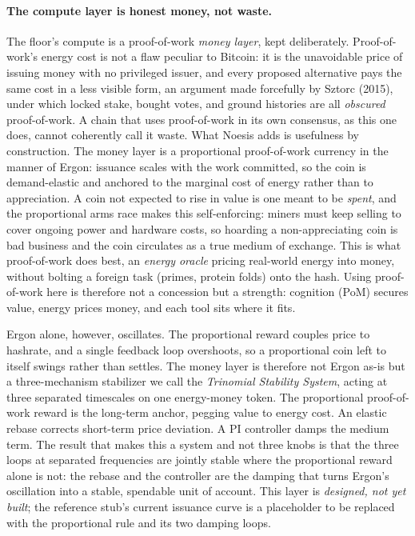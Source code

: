 \documentclass[10pt]{article}
\begin{document}
\paragraph{The compute layer is honest money, not waste.} The floor's compute is a proof-of-work
\emph{money layer}, kept deliberately. Proof-of-work's energy cost is not a flaw peculiar to Bitcoin: it
is the unavoidable price of issuing money with no privileged issuer, and every proposed alternative pays
the same cost in a less visible form, an argument made forcefully by Sztorc (2015), under which locked
stake, bought votes, and ground histories are all \emph{obscured} proof-of-work. A chain that uses
proof-of-work in its own consensus, as this one does, cannot coherently call it waste. What Noesis adds
is usefulness by construction. The money layer is a proportional proof-of-work currency in the manner of
Ergon: issuance scales with the work committed, so the coin is demand-elastic and anchored to the
marginal cost of energy rather than to appreciation. A coin not expected to rise in value is one meant to
be \emph{spent}, and the proportional arms race makes this self-enforcing: miners must keep selling to
cover ongoing power and hardware costs, so hoarding a non-appreciating coin is bad business and the coin
circulates as a true medium of exchange. This is what proof-of-work does best, an \emph{energy oracle}
pricing real-world energy into money, without bolting a foreign task (primes, protein folds) onto the
hash. Using proof-of-work here is therefore not a concession but a strength: cognition (PoM) secures
value, energy prices money, and each tool sits where it fits.

Ergon alone, however, oscillates. The proportional reward couples price to hashrate, and a single
feedback loop overshoots, so a proportional coin left to itself swings rather than settles. The money
layer is therefore not Ergon as-is but a three-mechanism stabilizer we call the \emph{Trinomial
Stability System}, acting at three separated timescales on one energy-money token. The proportional proof-of-work
reward is the long-term anchor, pegging value to energy cost. An elastic rebase corrects short-term
price deviation. A PI controller damps the medium term. The result that makes this a system and not three
knobs is that the three loops at separated frequencies are jointly stable where the proportional reward
alone is not: the rebase and the controller are the damping that turns Ergon's oscillation into a stable,
spendable unit of account. This layer is \emph{designed, not yet built}; the reference stub's current
issuance curve is a placeholder to be replaced with the proportional rule and its two damping loops.
\end{document}
